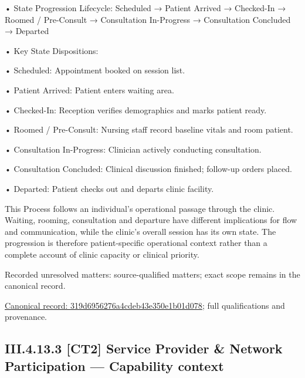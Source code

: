 •
State Progression Lifecycle: Scheduled → Patient Arrived → Checked-In → Roomed / Pre-Consult → Consultation In-Progress → Consultation Concluded → Departed



•
Key State Dispositions:



•
Scheduled: Appointment booked on session list.



•
Patient Arrived: Patient enters waiting area.



•
Checked-In: Reception verifies demographics and marks patient ready.



•
Roomed / Pre-Consult: Nursing staff record baseline vitals and room patient.



•
Consultation In-Progress: Clinician actively conducting consultation.



•
Consultation Concluded: Clinical discussion finished; follow-up orders placed.



•
Departed: Patient checks out and departs clinic facility.



This Process follows an individual's operational passage through the clinic. Waiting, rooming, consultation and departure have different implications for flow and communication, while the clinic's overall session has its own state. The progression is therefore patient-specific operational context rather than a complete account of clinic capacity or clinical priority.


{\small Recorded unresolved matters: source-qualified matters; exact scope remains in the canonical record.}\par
{\footnotesize \href{../../../../../../../../continuum/business/business-process/319d6956276a4cdeb43e350e1b01d078.md}{Canonical record: 319d6956276a4cdeb43e350e1b01d078}; full qualifications and provenance.}\par
\subsection*{III.4.13.3 [CT2] Service Provider \& Network Participation — Capability context}
\label{navigation:III.4.13.3}

